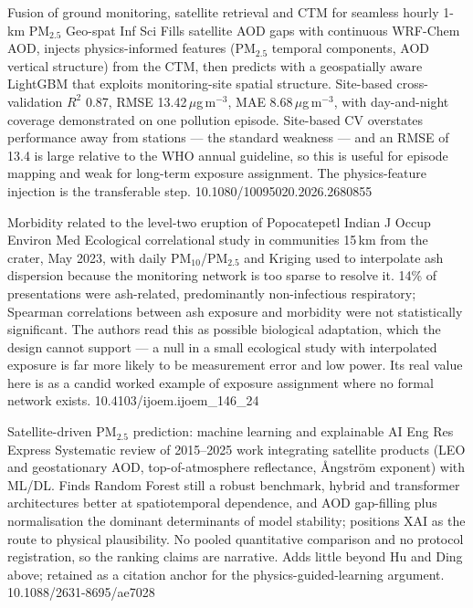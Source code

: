 \documentclass[10pt]{article}
\begin{document}
{Fusion of ground monitoring, satellite retrieval and CTM for seamless hourly 1-km PM$_{2.5}$}
{Geo-spat Inf Sci}
{Fills satellite AOD gaps with continuous WRF-Chem AOD, injects physics-informed features
(PM$_{2.5}$ temporal components, AOD vertical structure) from the CTM, then predicts with
a geospatially aware LightGBM that exploits monitoring-site spatial structure. Site-based
cross-validation $R^2$ 0.87, RMSE 13.42\,$\mu$g\,m$^{-3}$, MAE 8.68\,$\mu$g\,m$^{-3}$,
with day-and-night coverage demonstrated on one pollution episode. Site-based CV
overstates performance away from stations --- the standard weakness --- and an RMSE of
13.4 is large relative to the WHO annual guideline, so this is useful for episode mapping
and weak for long-term exposure assignment. The physics-feature injection is the
transferable step.}
{10.1080/10095020.2026.2680855}

{Morbidity related to the level-two eruption of Popocatepetl}
{Indian J Occup Environ Med}
{Ecological correlational study in communities 15\,km from the crater, May 2023, with
daily PM$_{10}$/PM$_{2.5}$ and Kriging used to interpolate ash dispersion because the
monitoring network is too sparse to resolve it. 14\% of presentations were ash-related,
predominantly non-infectious respiratory; Spearman correlations between ash exposure and
morbidity were not statistically significant. The authors read this as possible
biological adaptation, which the design cannot support --- a null in a small ecological
study with interpolated exposure is far more likely to be measurement error and low
power. Its real value here is as a candid worked example of exposure assignment where no
formal network exists.}
{10.4103/ijoem.ijoem_146_24}

{Satellite-driven PM$_{2.5}$ prediction: machine learning and explainable AI}
{Eng Res Express}
{Systematic review of 2015--2025 work integrating satellite products (LEO and
geostationary AOD, top-of-atmosphere reflectance, {\AA}ngstr\"om exponent) with ML/DL.
Finds Random Forest still a robust benchmark, hybrid and transformer architectures better
at spatiotemporal dependence, and AOD gap-filling plus normalisation the dominant
determinants of model stability; positions XAI as the route to physical plausibility. No
pooled quantitative comparison and no protocol registration, so the ranking claims are
narrative. Adds little beyond Hu and Ding above; retained as a citation anchor for the
physics-guided-learning argument.}
{10.1088/2631-8695/ae7028}
\end{document}
